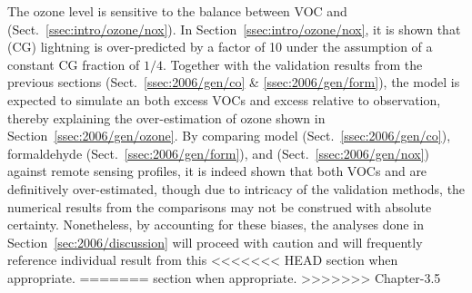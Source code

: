 \noindent The ozone level is sensitive to the balance between VOC and  (Sect.~\ref{ssec:intro/ozone/nox}). In
Section~\ref{ssec:intro/ozone/nox}, it is shown that (CG) lightning is over-predicted by a factor of 10 under the assumption of a constant
CG fraction of $1/4$. Together with the validation results from the previous sections (Sect.~\ref{ssec:2006/gen/co} \& \ref{ssec:2006/gen/form}),
the model is expected to simulate an both excess VOCs and excess  relative to observation, thereby explaining the
over-estimation of ozone shown in Section~\ref{ssec:2006/gen/ozone}. By comparing model  (Sect.~\ref{ssec:2006/gen/co}),
formaldehyde (Sect.~\ref{ssec:2006/gen/form}), and  (Sect.~\ref{ssec:2006/gen/nox}) against remote sensing profiles, it is
indeed shown that both VOCs and  are definitively over-estimated, though due to intricacy of the validation methods, the
numerical results from the comparisons may not be construed with absolute certainty. Nonetheless,  by accounting for these biases, the
analyses done in Section~\ref{sec:2006/discussion} will proceed with caution and will frequently reference individual result from this
<<<<<<< HEAD
section when appropriate.
=======
section when appropriate.
>>>>>>> Chapter-3.5
